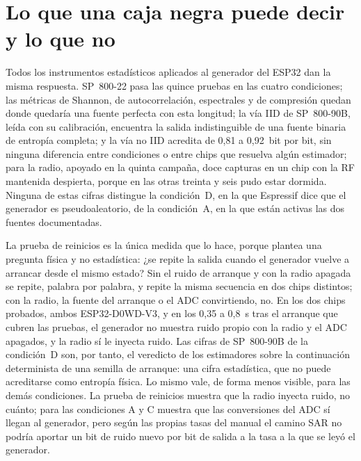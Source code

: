 \section{Lo que una caja negra puede decir y lo que no}
\label{sec:esp32_lessons}

Todos los instrumentos estadísticos aplicados al generador del ESP32 dan
la misma respuesta. SP~800-22 pasa las quince pruebas en las cuatro
condiciones; las métricas de Shannon, de autocorrelación, espectrales y de
compresión quedan donde quedaría una fuente perfecta con esta longitud;
la vía IID de SP~800-90B, leída con su calibración, encuentra la salida
indistinguible de una fuente binaria de entropía completa; y la vía no
IID acredita de 0,81 a 0,92~bit por bit, sin ninguna diferencia entre
condiciones o entre chips que resuelva algún estimador; para la radio,
apoyado en la quinta campaña, doce capturas en un chip con la RF
mantenida despierta, porque en las otras treinta y seis pudo estar
dormida. Ninguna de estas
cifras distingue la condición~D, en la que Espressif dice que el
generador es pseudoaleatorio, de la condición~A, en la que están activas
las dos fuentes documentadas.

La prueba de reinicios es la única medida que lo hace, porque plantea una
pregunta física y no estadística: ¿se repite la salida cuando el
generador vuelve a arrancar desde el mismo estado? Sin el ruido de
arranque y con la radio apagada se repite, palabra por palabra, y repite
la misma secuencia en dos chips distintos; con la radio, la fuente del
arranque o el ADC convirtiendo, no. En los dos chips probados, ambos
ESP32-D0WD-V3, y en los 0,35 a 0,8~s tras el arranque que cubren las
pruebas, el generador no muestra ruido propio con la radio y el
ADC apagados, y la radio sí le inyecta ruido. Las cifras de SP~800-90B de
la condición~D son, por tanto, el veredicto de los estimadores sobre la
continuación determinista de una semilla de arranque: una cifra
estadística, que no puede acreditarse como entropía física. Lo mismo
vale, de forma menos visible, para las demás condiciones. La prueba de
reinicios muestra que la radio inyecta ruido, no cuánto; para las
condiciones A y C muestra que las conversiones del ADC sí llegan al
generador, pero según las propias tasas del manual el camino
SAR no podría aportar un bit de ruido nuevo por bit de salida a la tasa a
la que se leyó el generador.

